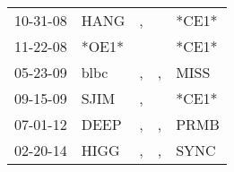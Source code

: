 \begin{supertabular}{lllll}
 10-31-08 &   HANG &  , &    &  *CE1* \\
 11-22-08 &  *OE1* &    &    &  *CE1* \\
 05-23-09 &   blbc &  , &  , &   MISS \\
 09-15-09 &   SJIM &  , &    &  *CE1* \\
 07-01-12 &   DEEP &  , &  , &   PRMB \\
 02-20-14 &   HIGG &  , &  , &   SYNC \\
\end{supertabular}
